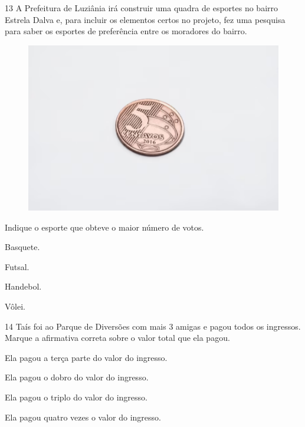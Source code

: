 \num{13} A Prefeitura de Luziânia irá construir uma quadra de esportes no bairro
Estrela Dalva e, para incluir os elementos certos no projeto, fez uma
pesquisa para saber os esportes de preferência entre os moradores
do bairro.

\begin{figure}[htpb!]
\centering
\includegraphics[width=.8\textwidth]{./media/image122.png}
\end{figure}

\pagebreak

Indique o esporte que obteve o maior número de votos.

\begin{minipage}{.5\textwidth}
\begin{escolha}
\item Basquete.

\item Futsal.

\item Handebol.

\item Vôlei.
\end{escolha}
\end{minipage}

\num{14} Taís foi ao Parque de Diversões com mais 3 amigas e pagou todos os ingressos. Marque a afirmativa correta sobre o valor total que ela pagou.

\begin{escolha}
\item Ela pagou a terça parte do valor do ingresso.

\item Ela pagou o dobro do valor do ingresso.

\item Ela pagou o triplo do valor do ingresso.

\item Ela pagou quatro vezes o valor do ingresso.
\end{escolha}

